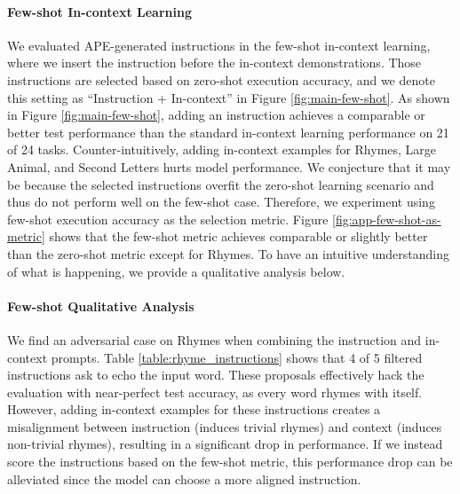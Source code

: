 \paragraph{Few-shot In-context Learning}
We evaluated APE-generated instructions in the few-shot in-context learning, where we insert the instruction before the in-context demonstrations. Those instructions are selected based on zero-shot execution accuracy, and we denote this setting as ``Instruction + In-context'' in Figure \ref{fig:main-few-shot}. As shown in Figure \ref{fig:main-few-shot}, adding an instruction achieves a comparable or better test performance than the standard in-context learning performance on 21 of 24 tasks. Counter-intuitively, adding in-context examples for Rhymes, Large Animal, and Second Letters hurts model performance. We conjecture that it may be because the selected instructions overfit the zero-shot learning scenario and thus do not perform well on the few-shot case. Therefore, we experiment using few-shot execution accuracy as the selection metric. Figure \ref{fig:app-few-shot-as-metric} shows that the few-shot metric achieves comparable or slightly better than the zero-shot metric except for Rhymes. To have an intuitive understanding of what is happening, we provide a qualitative analysis below. 

\paragraph{Few-shot Qualitative Analysis}
\label{few-shot_qualitative_analysis}
We find an adversarial case on Rhymes when combining the instruction and in-context prompts. Table \ref{table:rhyme_instructions} shows that 4 of 5 filtered instructions ask to echo the input word. These proposals effectively hack the evaluation with near-perfect test accuracy, as every word rhymes with itself. However, adding in-context examples for these instructions creates a misalignment between instruction (induces trivial rhymes) and context (induces non-trivial rhymes), resulting in a significant drop in performance. If we instead score the instructions based on the few-shot metric, this performance drop can be alleviated since the model can choose a more aligned instruction. 

